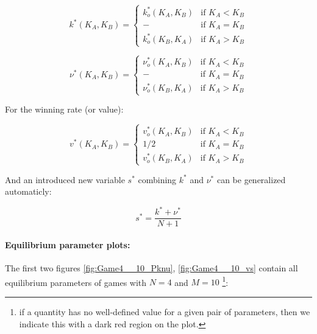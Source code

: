 \documentclass{article}
\theoremstyle{definition}
\begin{document}
\begin{equation}
    k^*(K_A,K_B) =
        \begin{cases}
        k^*_o(K_A,K_B) & \text{if } K_A < K_B \\
        -              & \text{if } K_A = K_B \\
        k^*_o(K_B,K_A) & \text{if } K_A > K_B
    \end{cases}
\end{equation}

\begin{equation}
    \nu^*(K_A,K_B) =
        \begin{cases}
        \nu^*_o(K_A,K_B)  & \text{if } K_A < K_B \\
        -                 & \text{if } K_A = K_B \\
        \nu^*_o(K_B,K_A)  & \text{if } K_A > K_B
    \end{cases}
\end{equation}

For the winning rate (or value):

\begin{equation}
    v^*(K_A,K_B) =
        \begin{cases}
        v^*_o(K_A,K_B)  & \text{if } K_A < K_B \\
        1/2           & \text{if } K_A = K_B \\
        v^*_o(K_B,K_A)  & \text{if } K_A > K_B
    \end{cases}
\end{equation}

And an introduced new variable $s^*$ combining $k^*$ and $\nu^*$ can be generalized automaticly:

\begin{equation}
    s^* = \frac{k^* + \nu^*}{N + 1}
\end{equation}

\paragraph{Equilibrium parameter plots:}

The first two figures \ref{fig:Game4__10_Pknu}, \ref{fig:Game4__10_vs} contain all equilibrium parameters of games with $N=4$ and $M=10$ \footnote{if a quantity has no well-defined value for a given pair of parameters, then we indicate this with a dark red region on the plot.}:
\end{document}
